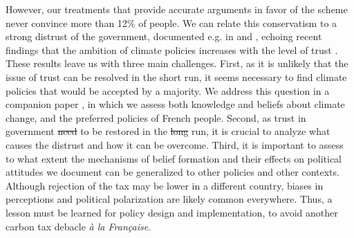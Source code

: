 \documentclass[12pt]{article} %
\providecommand{\DIFaddtex}[1]{{\protect\color{blue}\uwave{#1}}} %
\providecommand{\DIFdeltex}[1]{{\protect\color{red}\sout{#1}}}                      %
\providecommand{\DIFaddbegin}{} %
\providecommand{\DIFaddend}{} %
\providecommand{\DIFdelbegin}{} %
\providecommand{\DIFdelend}{} %
\providecommand{\DIFadd}[1]{\texorpdfstring{\DIFaddtex{#1}}{#1}} %
\providecommand{\DIFdel}[1]{\texorpdfstring{\DIFdeltex{#1}}{}} %
\newcommand{\DIFscaledelfig}{0.5}
\newlength{\DIFdelgraphicswidth} %
\newlength{\DIFdelgraphicsheight} %
\newcommand{\DIFaddincludegraphics}[2][]{{\color{blue}\fbox{\DIFOincludegraphics[#1]{#2}}}} %
\newcommand{\DIFdelincludegraphics}[2][]{%
\sbox{\DIFdelgraphicsbox}{\DIFOincludegraphics[#1]{#2}}%
\settoboxwidth{\DIFdelgraphicswidth}{\DIFdelgraphicsbox} %
\settoboxtotalheight{\DIFdelgraphicsheight}{\DIFdelgraphicsbox} %
\scalebox{\DIFscaledelfig}{%
\parbox[b]{\DIFdelgraphicswidth}{\usebox{\DIFdelgraphicsbox}\\[-\baselineskip] \rule{\DIFdelgraphicswidth}{0em}}\llap{\resizebox{\DIFdelgraphicswidth}{\DIFdelgraphicsheight}{%
\setlength{\unitlength}{\DIFdelgraphicswidth}%
\begin{picture}(1,1)%
\thicklines\linethickness{2pt} %
{\color[rgb]{1,0,0}\put(0,0){\framebox(1,1){}}}%
{\color[rgb]{1,0,0}\put(0,0){\line( 1,1){1}}}%
{\color[rgb]{1,0,0}\put(0,1){\line(1,-1){1}}}%
\end{picture}%
}\hspace*{3pt}}} %
} %
\DeclareRobustCommand{\DIFaddbegin}{\DIFOaddbegin \let\includegraphics\DIFaddincludegraphics} %
\DeclareRobustCommand{\DIFaddend}{\DIFOaddend \let\includegraphics\DIFOincludegraphics} %
\DeclareRobustCommand{\DIFdelbegin}{\DIFOdelbegin \let\includegraphics\DIFdelincludegraphics} %
\DeclareRobustCommand{\DIFdelend}{\DIFOaddend \let\includegraphics\DIFOincludegraphics} %
\begin{document}
However, our treatments that provide accurate arguments in favor of the scheme never convince more than 12\% of people. We can relate this conservatism to a strong distrust of the government, documented e.g. in \citet{alesina_intergenerational_2018} and \citet{algan_et_al_19}, echoing recent findings that the ambition of climate policies increases with the level of trust \citep{rafaty_perceptions_2018}. These results leave us with three main challenges. First, as it is unlikely that the issue of trust can be resolved in the short run, it seems necessary to find climate policies that would be accepted by a majority. We address this question in a companion paper \citep{douenne_french_2019}, in which we assess both knowledge and beliefs about climate change, and the preferred policies of French people. Second, as trust in government \DIFdelbegin \DIFdel{need }\DIFdelend \DIFaddbegin \DIFadd{needs }\DIFaddend to be restored in the \DIFdelbegin \DIFdel{long }\DIFdelend \DIFaddbegin \DIFadd{longer }\DIFaddend run, it is crucial to analyze what causes the distrust and how it can be overcome. Third, it is important to assess to what extent the mechanisms of belief formation and their effects on political attitudes we document can be generalized to other policies and other contexts. Although rejection of the tax may be lower in a different country, biases in perceptions and political polarization are likely common everywhere. Thus, a lesson must be learned for policy design and implementation, to avoid another carbon tax debacle \textit{à la Française}.

\end{document}
